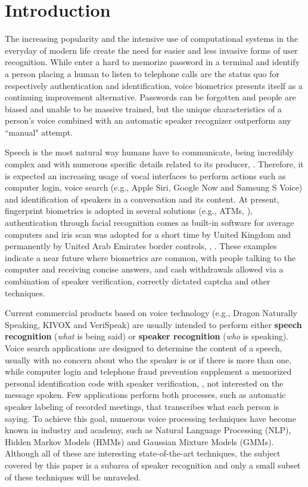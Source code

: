 \chapter{Introduction}
\label{ch:intro}

The increasing popularity and the intensive use of computational systems in the everyday of modern life create the need for easier and less invasive forms of user recognition. While enter a hard to memorize password in a terminal and identify a person placing a human to listen to telephone calls are the status quo for respectively authentication and identification, voice biometrics presents itself as a continuing improvement alternative. Passwords can be forgotten and people are biased and unable to be massive trained, but the unique characteristics of a person's voice combined with an automatic speaker recognizer outperform any ``manual" attempt.

Speech is the most natural way humans have to communicate, being incredibly complex and with numerous specific details related to its producer, . Therefore, it is expected an increasing usage of vocal interfaces to perform actions such as computer login, voice search (e.g., Apple Siri, Google Now and Samsung S Voice) and identification of speakers in a conversation and its content. At present, fingerprint biometrics is adopted in several solutions (e.g., ATMs, ), authentication through facial recognition comes as built-in software for average computers and iris scan was adopted for a short time by United Kingdom and permanently by United Arab Emirates border controls, , . These examples indicate a near future where biometrics are common, with people talking to the computer and receiving concise answers, and cash withdrawals allowed via a combination of speaker verification, correctly dictated captcha and other techniques.

Current commercial products based on voice technology (e.g., Dragon Naturally Speaking, KIVOX and VeriSpeak) are usually intended to perform either \textbf{speech recognition} (\emph{what} is being said) or \textbf{speaker recognition} (\emph{who} is speaking). Voice search applications are designed to determine the content of a speech, usually with no concern about who the speaker is or if there is more than one, while computer login and telephone fraud prevention supplement a memorized personal identification code with speaker verification, , not interested on the message spoken. Few applications perform both processes, such as automatic speaker labeling of recorded meetings, that transcribes what each person is saying. To achieve this goal, numerous voice processing techniques have become known in industry and academy, such as Natural Language Processing (NLP), Hidden Markov Models (HMMs) and Gaussian Mixture Models (GMMs). Although all of these are interesting state-of-the-art techniques, the subject covered by this paper is a subarea of speaker recognition and only a small subset of these techniques will be unraveled.

